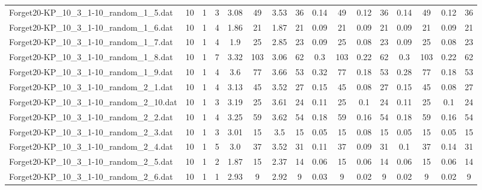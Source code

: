 \begin{sidewaystable}[!ht]
{\begin{tabular}{lccccccccccccccc}
Forget20-KP\_10\_3\_1-10\_random\_1\_5.dat & 10 & 1 & 3 & 3.08 & 49 & 3.53 & 36 & 0.14 & 49 &  \textcolor{blue2}{0.12} & 36 & 0.14 & 49 &  \textcolor{blue2}{0.12} & 36 \\
Forget20-KP\_10\_3\_1-10\_random\_1\_6.dat & 10 & 1 & 4 & 1.86 & 21 & 1.87 & 21 &  \textcolor{blue2}{0.09} & 21 &  \textcolor{blue2}{0.09} & 21 &  \textcolor{blue2}{0.09} & 21 &  \textcolor{blue2}{0.09} & 21 \\
Forget20-KP\_10\_3\_1-10\_random\_1\_7.dat & 10 & 1 & 4 & 1.9 & 25 & 2.85 & 23 & 0.09 & 25 &  \textcolor{blue2}{0.08} & 23 & 0.09 & 25 &  \textcolor{blue2}{0.08} & 23 \\
Forget20-KP\_10\_3\_1-10\_random\_1\_8.dat & 10 & 1 & 7 & 3.32 & 103 & 3.06 & 62 & 0.3 & 103 &  \textcolor{blue2}{0.22} & 62 & 0.3 & 103 &  \textcolor{blue2}{0.22} & 62 \\
Forget20-KP\_10\_3\_1-10\_random\_1\_9.dat & 10 & 1 & 4 & 3.6 & 77 & 3.66 & 53 & 0.32 & 77 &  \textcolor{blue2}{0.18} & 53 & 0.28 & 77 &  \textcolor{blue2}{0.18} & 53 \\
Forget20-KP\_10\_3\_1-10\_random\_2\_1.dat & 10 & 1 & 4 & 3.13 & 45 & 3.52 & 27 & 0.15 & 45 &  \textcolor{blue2}{0.08} & 27 & 0.15 & 45 &  \textcolor{blue2}{0.08} & 27 \\
Forget20-KP\_10\_3\_1-10\_random\_2\_10.dat & 10 & 1 & 3 & 3.19 & 25 & 3.61 & 24 & 0.11 & 25 &  \textcolor{blue2}{0.1} & 24 & 0.11 & 25 &  \textcolor{blue2}{0.1} & 24 \\
Forget20-KP\_10\_3\_1-10\_random\_2\_2.dat & 10 & 1 & 4 & 3.25 & 59 & 3.62 & 54 & 0.18 & 59 &  \textcolor{blue2}{0.16} & 54 & 0.18 & 59 &  \textcolor{blue2}{0.16} & 54 \\
Forget20-KP\_10\_3\_1-10\_random\_2\_3.dat & 10 & 1 & 3 & 3.01 & 15 & 3.5 & 15 &  \textcolor{blue2}{0.05} & 15 & 0.08 & 15 &  \textcolor{blue2}{0.05} & 15 &  \textcolor{blue2}{0.05} & 15 \\
Forget20-KP\_10\_3\_1-10\_random\_2\_4.dat & 10 & 1 & 5 & 3.0 & 37 & 3.52 & 31 & 0.11 & 37 &  \textcolor{blue2}{0.09} & 31 & 0.1 & 37 & 0.14 & 31 \\
Forget20-KP\_10\_3\_1-10\_random\_2\_5.dat & 10 & 1 & 2 & 1.87 & 15 & 2.37 & 14 &  \textcolor{blue2}{0.06} & 15 &  \textcolor{blue2}{0.06} & 14 &  \textcolor{blue2}{0.06} & 15 &  \textcolor{blue2}{0.06} & 14 \\
Forget20-KP\_10\_3\_1-10\_random\_2\_6.dat & 10 & 1 & 1 & 2.93 & 9 & 2.92 & 9 & 0.03 & 9 &  \textcolor{blue2}{0.02} & 9 &  \textcolor{blue2}{0.02} & 9 &  \textcolor{blue2}{0.02} & 9 \\

\end{tabular}}
\end{sidewaystable}
